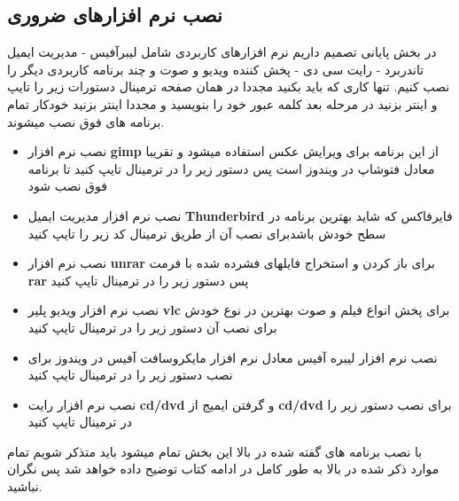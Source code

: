 \subsection{نصب نرم افزارهای ضروری}\label{se-235}
در بخش پایانی تصمیم داریم نرم افزارهای کاربردی شامل لیبرآفیس - مدیریت ایمیل تاندربرد - رایت سی دی - پخش کننده ویدیو و صوت و چند برنامه کاربردی دیگر را نصب کنیم. تنها کاری که باید بکنید مجددا در همان صفحه ترمینال دستورات زیر را تایپ و اینتر بزنید در مرحله بعد کلمه عبور خود را بنویسید و مجددا اینتر بزنید خودکار تمام برنامه های فوق نصب میشوند.
\begin{itemize}
	\item نصب نرم افزار 
	\textbf{gimp}
	 از این برنامه برای ویرایش عکس استفاده میشود و تقریبا معادل فتوشاپ در ویندوز است پس دستور زیر را در ترمینال تایپ کنید تا برنامه فوق نصب شود
	 \begin{flushleft}
	 \end{flushleft}
 \item نصب نرم افزار مدیریت ایمیل 
 \textbf{Thunderbird}
  فایرفاکس که شاید بهترین برنامه در سطح خودش باشدبرای نصب آن از طریق ترمینال کد زیر را تایپ کنید
  \begin{flushleft}
  \end{flushleft}
\item نصب نرم افزار 
\textbf{unrar}
 برای باز کردن و استخراج فایلهای فشرده شده با فرمت 
 \textbf{rar}
  پس دستور زیر را در ترمینال تایپ کنید 
   \begin{flushleft}
  \end{flushleft}
\item نصب نرم افزار ویدیو پلیر 
\textbf{vlc}
برای پخش انواع فیلم و  صوت بهترین در نوع خودش برای نصب آن دستور زیر را در ترمینال تایپ کنید
   \begin{flushleft}
\end{flushleft}
\item نصب نرم افزار لیبره آفیس معادل نرم افزار مایکروسافت آفیس در ویندوز برای نصب دستور زیر را در ترمینال تایپ کنید
  \begin{flushleft}
\end{flushleft}
\item نصب نرم افزار رایت 
\textbf{cd/dvd}
 و گرفتن ایمیج از 
\textbf{cd/dvd}
برای نصب دستور زیر را در ترمینال تایپ کنید
  \begin{flushleft}
\end{flushleft}
\end{itemize}
با نصب برنامه های گفته شده در بالا این بخش تمام میشود باید متذکر شویم تمام موارد ذکر شده در بالا به طور کامل در ادامه کتاب توضیح داده خواهد شد پس نگران نباشید. 